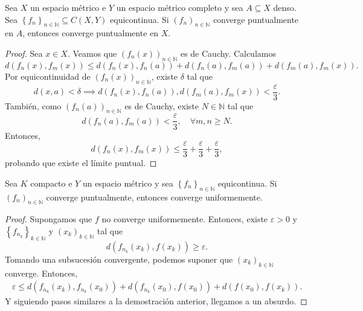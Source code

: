 \begin{lemma}
	Sea $X$ un espacio métrico e $Y$ un espacio métrico completo y sea $A \subseteq X$ denso. Sea $\left\{ f_n \right\}_{n \in \mathbb{N}} \subseteq C(X, Y)$ equicontinua. Si $(f_n)_{n \in \mathbb{N}}$ converge puntualmente en $A$, entonces converge puntualmente en $X$.
\end{lemma}

\begin{proof}
	Sea $x \in X$. Veamos que $(f_n(x))_{n \in \mathbb{N}}$ es de Cauchy. Calculamos
	\begin{equation*}
		d(f_n(x), f_m(x)) \leq d(f_n(x), f_n(a)) + d(f_n(a), f_m(a)) + d(f_m(a), f_m(x)).
	\end{equation*}
	Por equicontinuidad de $(f_n(x))_{n \in \mathbb{N}}$, existe $\delta$ tal que
	\begin{equation*}
		d(x, a) < \delta \implies d(f_n(x), f_n(a)), d(f_m(a), f_m(x)) < \frac{\varepsilon}{3}.
	\end{equation*}
	También, como $(f_n(a))_{n \in \mathbb{N}}$ es de Cauchy, existe $N \in \mathbb{N}$ tal que
	\begin{equation*}
		d(f_n(a), f_m(a)) < \frac{\varepsilon}{3}, \quad \forall m, n \geq N.
	\end{equation*}
	Entonces,
	\begin{equation*}
		d(f_n(x), f_m(x)) \leq \frac{\varepsilon}{3} + \frac{\varepsilon}{3} + \frac{\varepsilon}{3},
	\end{equation*}
	probando que existe el límite puntual.
\end{proof}

\begin{lemma}
	Sea $K$ compacto e $Y$ un espacio métrico y sea $\left\{ f_n \right\}_{n \in \mathbb{N}}$ equicontinua. Si $\left( f_n \right)_{n \in \mathbb{N}}$ converge puntualmente, entonces converge uniformemente.
\end{lemma}

\begin{proof}
	Supongamos que $f$ no converge uniformemente. Entonces, existe $\varepsilon > 0$ y $\left\{ f_{n_k} \right\}_{k \in \mathbb{N}}$ y $(x_k)_{k \in \mathbb{N}}$ tal que
	\begin{equation*}
		d(f_{n_k}(x_k), f(x_k)) \geq \varepsilon.
	\end{equation*}
	Tomando una subsucesión convergente, podemos suponer que $(x_k)_{k \in \mathbb{N}}$ converge. Entonces,
	\begin{align*}
		\varepsilon \leq d(f_{n_k}(x_k), f_{n_k}(x_0)) + d(f_{n_k}(x_0), f(x_0)) + d(f(x_0), f(x_k)).
	\end{align*}
	Y siguiendo pasos similares a la demostración anterior, llegamos a un absurdo.
\end{proof}

